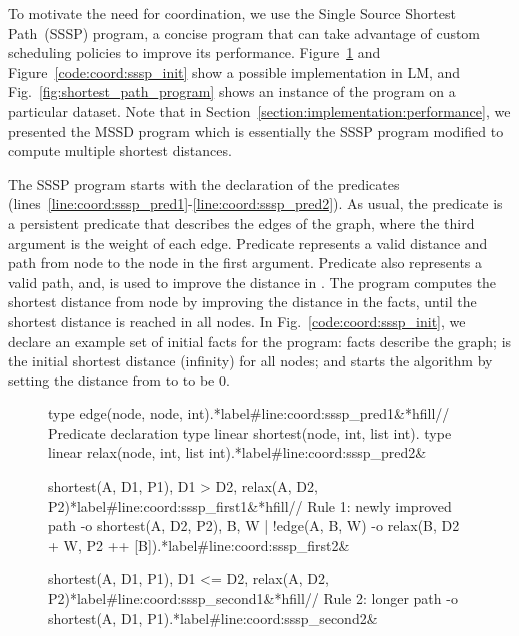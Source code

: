 To motivate the need for coordination, we use the Single Source Shortest
Path~(SSSP) program, a concise program that can take advantage of custom
scheduling policies to improve its performance.
Figure~\ref{code:shortest_path_program} and Figure~\ref{code:coord:sssp_init}
show a possible implementation in LM, and Fig.~\ref{fig:shortest_path_program}
shows an instance of the program on a particular dataset. Note that in
Section~\ref{section:implementation:performance}, we presented the MSSD program
which is essentially the SSSP program modified to compute multiple shortest
distances.

The SSSP program starts with the declaration of the predicates~
(lines~\ref{line:coord:sssp_pred1}-\ref{line:coord:sssp_pred2}). As usual, the
 predicate is a persistent predicate that describes the edges of the
graph, where the third argument is the weight of each edge. Predicate
 represents a valid distance and path from node  to the
node in the first argument.  Predicate  also represents a valid
path, and, is used to improve the distance in .  The program
computes the shortest distance from node  by improving the distance in
the  facts, until the shortest distance is reached in all nodes.
In Fig.~\ref{code:coord:sssp_init}, we declare an example set of initial facts
for the program:  facts describe the graph;  is the initial shortest distance (infinity) for all nodes; and
 starts the algorithm by setting the distance from
 to  to be 0.

\begin{figure}[ht]
\begin{LineCode}[commandchars=\*\#\&]
type edge(node, node, int).*label#line:coord:sssp_pred1&*hfill// Predicate declaration
type linear shortest(node, int, list int).
type linear relax(node, int, list int).*label#line:coord:sssp_pred2&

shortest(A, D1, P1), D1 > D2, relax(A, D2, P2)*label#line:coord:sssp_first1&*hfill// Rule 1: newly improved path
   -o shortest(A, D2, P2),
      {B, W | !edge(A, B, W) -o relax(B, D2 + W, P2 ++ [B])}.*label#line:coord:sssp_first2&

shortest(A, D1, P1), D1 <= D2, relax(A, D2, P2)*label#line:coord:sssp_second1&*hfill// Rule 2: longer path
   -o shortest(A, D1, P1).*label#line:coord:sssp_second2&
\end{LineCode}
\label{code:shortest_path_program}
\end{figure}

